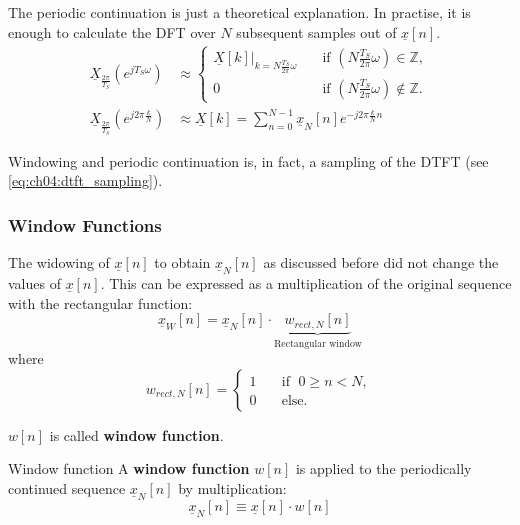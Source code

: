 \begin{refsection}
The periodic continuation is just a theoretical explanation. In practise, it is enough to calculate the \ac{DFT} over $N$ subsequent samples out of $\underline{x}[n]$.
\begin{equation}
	\begin{split}
		\underline{X}_{\frac{2\pi}{T_S}}\left(e^{j T_S \omega}\right) &\approx \begin{cases}
			\left.\underline{X}[k]\right|_{k = N \frac{T_S}{2\pi} \omega} & \quad \text{if } \left(N \frac{T_S}{2\pi} \omega\right) \in \mathbb{Z}, \\
			0 & \quad \text{if } \left(N \frac{T_S}{2\pi} \omega\right) \notin \mathbb{Z}.
		\end{cases} \\
		\underline{X}_{\frac{2\pi}{T_S}}\left(e^{j 2 \pi \frac{k}{N}}\right) &\approx \underline{X}[k] = \sum\limits_{n=0}^{N-1} \underline{x}_N[n] e^{-j 2 \pi \frac{k}{N} n}
	\end{split}
	\label{eq:ch04:dtft_sampling}
\end{equation}

Windowing and periodic continuation is, in fact, a sampling of the \ac{DTFT} (see \eqref{eq:ch04:dtft_sampling}).

\subsubsection{Window Functions}

The widowing of $\underline{x}[n]$ to obtain $\underline{x}_N[n]$ as discussed before did not change the values of $\underline{x}[n]$. This can be expressed as a multiplication of the original sequence with the rectangular function:
\begin{equation}
	\underline{x}_W[n] = \underline{x}_N[n] \cdot \underbrace{w_{rect,N}[n]}_{\text{Rectangular window}}
\end{equation}
where
\begin{equation}
	w_{rect,N}[n] = \begin{cases}
		1 &\quad \text{if } \; 0 \geq n < N, \\
		0 &\quad \text{else}.
	\end{cases}
\end{equation}

$w[n]$ is called  \textbf{window function}.
\begin{definition}{Window function}
	A  \textbf{window function} $w[n]$ is applied to the periodically continued sequence $\underline{x}_N[n]$ by multiplication:
	\begin{equation}
		\underline{x}_N[n] \equiv \underline{x}[n] \cdot w[n]
	\end{equation}
\end{definition}


\end{refsection}
